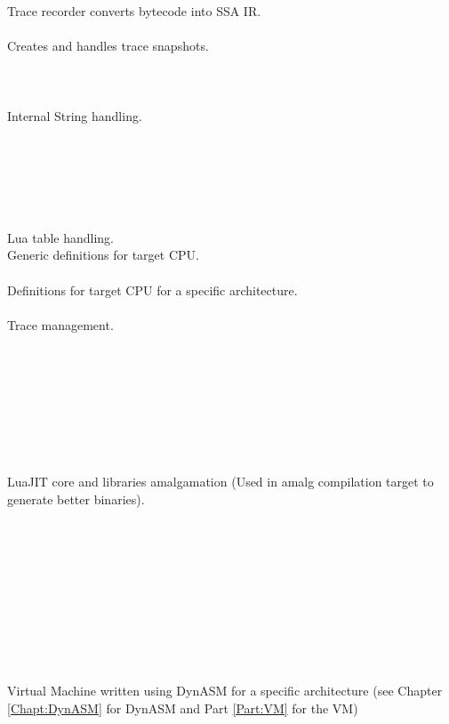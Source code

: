 Trace recorder converts bytecode into SSA IR.\\
\\
Creates and handles trace snapshots.\\
\\
\\
\\
Internal String handling.\\
\\
\\
\\
\\
\\
\\
Lua table handling.
\\
Generic definitions for target CPU.\\
\\
Definitions for target CPU for a specific architecture.\\
\\
Trace management.\\
\\
\\
\\
\\
\\
\\
\\
\\
LuaJIT core and libraries amalgamation (Used in amalg compilation target to generate better binaries).\\
\\
\\
\\
\\
\\
\\
\\
\\
\\
\\
Virtual Machine written using DynASM for a specific architecture (see Chapter \ref{Chapt:DynASM} for DynASM and Part \ref{Part:VM} for the VM)\\
\\
\\